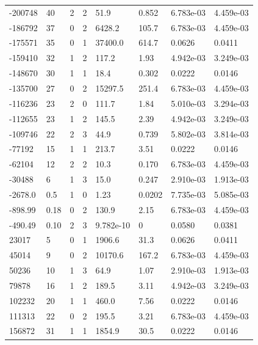 \documentclass[preview]{standalone}
\begin{document}
{{\begin{tabular}{L{1.2cm}C{1.2cm} C{0.3cm}C{0.5cm} C{1.4cm}C{1.4cm} C{1.4cm}C{1.4cm}}
  -200748  &    40  & 2     &  2 &  51.9  & 0.852  & 6.783e-03 &  4.459e-03   \\ 
  -186792  &    37  & 0     &  2 &  6428.2  & 105.7  & 6.783e-03 &  4.459e-03   \\ 
  -175571  &    35  & 0     &  1 &  37400.0  & 614.7  & 0.0626 &  0.0411   \\ 
  -159410  &    32  & 1     &  2 &  117.2  & 1.93  & 4.942e-03 &  3.249e-03   \\ 
  -148670  &    30  & 1     &  1 &  18.4  & 0.302  & 0.0222 &  0.0146   \\ 
  -135700  &    27  & 0     &  2 &  15297.5  & 251.4  & 6.783e-03 &  4.459e-03   \\ 
  -116236  &    23  & 2     &  0 &  111.7  & 1.84  & 5.010e-03 &  3.294e-03   \\ 
  -112655  &    23  & 1     &  2 &  145.5  & 2.39  & 4.942e-03 &  3.249e-03   \\ 
  -109746  &    22  & 2     &  3 &  44.9  & 0.739  & 5.802e-03 &  3.814e-03   \\ 
  -77192  &    15  & 1     &  1 &  213.7  & 3.51  & 0.0222 &  0.0146   \\ 
  -62104  &    12  & 2     &  2 &  10.3  & 0.170  & 6.783e-03 &  4.459e-03   \\ 
  -30488  &     6  & 1     &  3 &  15.0  & 0.247  & 2.910e-03 &  1.913e-03   \\ 
  -2678.0  &   0.5  & 1     &  0 &  1.23  & 0.0202  & 7.735e-03 &  5.085e-03   \\ 
  -898.99  &  0.18  & 0     &  2 &  130.9  & 2.15  & 6.783e-03 &  4.459e-03   \\ 
  -490.49  &  0.10  & 2     &  3 &  9.782e-10  & 0  & 0.0580 &  0.0381   \\ 
  23017  &     5  & 0     &  1 &  1906.6  & 31.3  & 0.0626 &  0.0411   \\ 
  45014  &     9  & 0     &  2 &  10170.6  & 167.2  & 6.783e-03 &  4.459e-03   \\ 
  50236  &    10  & 1     &  3 &  64.9  & 1.07  & 2.910e-03 &  1.913e-03   \\ 
  79878  &    16  & 1     &  2 &  189.5  & 3.11  & 4.942e-03 &  3.249e-03   \\ 
  102232  &    20  & 1     &  1 &  460.0  & 7.56  & 0.0222 &  0.0146   \\ 
  111313  &    22  & 0     &  2 &  195.5  & 3.21  & 6.783e-03 &  4.459e-03   \\ 
  156872  &    31  & 1     &  1 &  1854.9  & 30.5  & 0.0222 &  0.0146   \\ 

\end{tabular}}}
\end{document}
